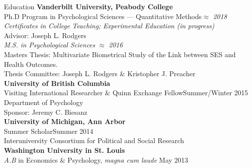 
\begin{rSection}{\textrm{Education}}
{\bf Vanderbilt University, Peabody College}\\
Ph.D Program in Psychological Sciences --- Quantitative Methods\hfill{\em $\approx$ 2018} \\
\hspace*{\pindent}\textit{Certificates in College Teaching; Experimental Education (in progress)}\\
\hspace*{\pindent}Advisor: Joseph L. Rodgers%
\smallskip\\
\textit{M.S. in Psychological Sciences} \hfill{\em $\approx$ 2016} \\
\hspace*{\pindent}Masters Thesis: Multivariate Biometrical Study of the Link between SES and Health Outcomes.\\
\hspace*{\pindent}Thesis Committee: Joseph L. Rodgers \& Kristopher J. Preacher%
\medskip\\
\textbf{University of British Columbia}\\
Visiting International Researcher \& Quinn Exchange Fellow\hfill{Summer/Winter 2015}\\
\hspace*{\pindent}Department of Psychology\\
\hspace*{\pindent}Sponsor: Jeremy C. Biesanz\medskip\\
\textbf{University of Michigan, Ann Arbor}\\
Summer Scholar\hfill{Summer 2014}\\
\hspace*{\pindent}Interuniversity Consortium for Political and Social Research\medskip\\
{\bf Washington University in St. Louis}\\
{\em A.B} in Economics \& Psychology, \textit{magna cum laude} \hfill{May 2013}%
\end{rSection}